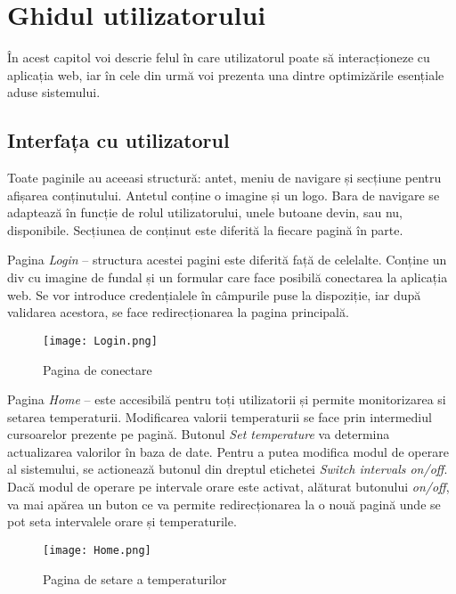\chapter{Ghidul utilizatorului}\label{ch:5interfataUtilizator}

	În acest capitol voi descrie felul în care utilizatorul poate să interacționeze cu aplicația web, iar în cele din urmă voi prezenta una dintre optimizările esențiale aduse sistemului.

\section{Interfața cu utilizatorul}

	Toate paginile au aceeasi structură: antet, meniu de navigare și secțiune pentru afișarea conținutului.
	Antetul conține o imagine și un logo.
	Bara de navigare se adaptează în funcție de rolul utilizatorului, unele butoane devin, sau nu, disponibile.
	Secțiunea de conținut este diferită la fiecare pagină în parte.
	
\vspace{1em}

	Pagina \textit{Login} – structura acestei pagini este diferită față de celelalte. Conține un div cu imagine de fundal și un formular care face posibilă conectarea la aplicația web. Se vor introduce credențialele în câmpurile puse la dispoziție, iar după validarea acestora, se face redirecționarea la pagina principală.

\begin{figure}[H]
   	\centering
    	\texttt{[image: Login.png]}
	\caption{Pagina de conectare}
\end{figure}

	Pagina \textit{Home} – este accesibilă pentru toți utilizatorii și permite monitorizarea si setarea temperaturii. Modificarea valorii temperaturii se face prin intermediul cursoarelor prezente pe pagină. Butonul \textit{Set temperature} va determina actualizarea valorilor în baza de date. Pentru a putea modifica modul de operare al sistemului, se actionează butonul din dreptul etichetei \textit{Switch intervals on/off}. Dacă modul de operare pe intervale orare este activat, alăturat butonului \textit{on/off}, va mai apărea un buton ce va permite redirecționarea la o nouă pagină unde se pot seta intervalele orare și temperaturile.

\begin{figure}[H]
   	\centering
    	\texttt{[image: Home.png]}
	\caption{Pagina de setare a temperaturilor}
\end{figure}


